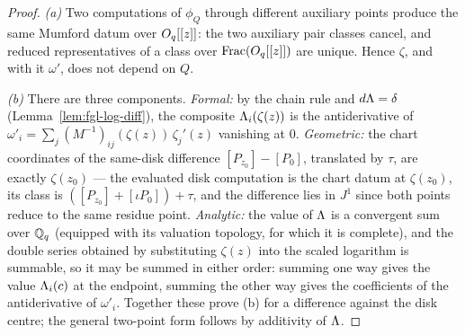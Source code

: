 \begin{proof}
\leanok
\emph{(a)} Two computations of $\phi_Q$ through different auxiliary points produce the
same Mumford datum over $O_q[[z]]$: the two auxiliary pair classes cancel, and reduced
representatives of a class over $\operatorname{Frac}(O_q[[z]])$ are unique. Hence
$\zeta$, and with it $\omega'$, does not depend on $Q$.

\emph{(b)} There are three components. \emph{Formal:} by the chain rule and
$d\Lambda = \delta$ (Lemma~\ref{lem:fgl-log-diff}), the composite $\Lambda_i(\zeta(z))$ is
the antiderivative of $\omega'_i = \sum_j (M^{-1})_{ij}(\zeta(z))\,\zeta_j'(z)$
vanishing at $0$. \emph{Geometric:} the chart coordinates of the same-disk difference
$[P_{z_0}]-[P_0]$, translated by $\tau$, are exactly $\zeta(z_0)$ --- the evaluated
disk computation is the chart datum at $\zeta(z_0)$, its class is
$([P_{z_0}]+[\iota P_0]) + \tau$, and the difference lies in $J^1$ since both points
reduce to the same residue point. \emph{Analytic:} the value of $\Lambda$ is a convergent
sum over $\mathbb{Q}_q$ (equipped with its valuation topology, for which it is complete), and
the double series obtained by substituting $\zeta(z)$ into the scaled logarithm is
summable, so it may be summed in either order: summing one way gives the value
$\Lambda_i(c)$ at the endpoint, summing the other way gives the coefficients of the
antiderivative of $\omega'_i$. Together these prove (b) for a difference against the
disk centre; the general two-point form follows by additivity of $\Lambda$.


\end{proof}
